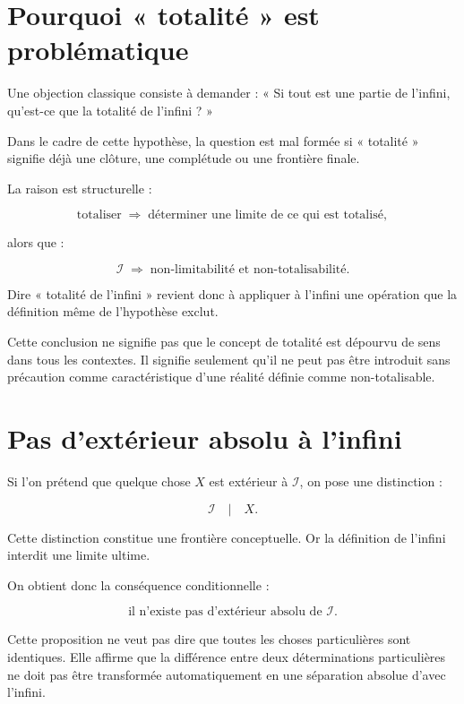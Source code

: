 \documentclass[11pt,a4paper]{article}
\newcommand{\Inf}{\mathcal I}
\begin{document}
\section{Pourquoi « totalité » est problématique}

Une objection classique consiste à demander : « Si tout est une partie de l'infini, qu'est-ce que la totalité de l'infini ? »

Dans le cadre de cette hypothèse, la question est mal formée si « totalité » signifie déjà une clôture, une complétude ou une frontière finale.

La raison est structurelle :

\[
\text{totaliser} \;\Rightarrow\; \text{déterminer une limite de ce qui est totalisé},
\]

alors que :

\[
\Inf \;\Rightarrow\; \text{non-limitabilité et non-totalisabilité}.
\]

Dire « totalité de l'infini » revient donc à appliquer à l'infini une opération que la définition même de l'hypothèse exclut.


Cette conclusion ne signifie pas que le concept de totalité est dépourvu de sens dans tous les contextes. Il signifie seulement qu'il ne peut pas être introduit sans précaution comme caractéristique d'une réalité définie comme non-totalisable.

\section{Pas d'extérieur absolu à l'infini}

Si l'on prétend que quelque chose \(X\) est extérieur à \(\Inf\), on pose une distinction :

\[
\Inf \quad | \quad X.
\]

Cette distinction constitue une frontière conceptuelle. Or la définition de l'infini interdit une limite ultime.

On obtient donc la conséquence conditionnelle :

\[
\boxed{
\text{il n'existe pas d'extérieur absolu de }\Inf.
}
\]

Cette proposition ne veut pas dire que toutes les choses particulières sont identiques. Elle affirme que la différence entre deux déterminations particulières ne doit pas être transformée automatiquement en une séparation absolue d'avec l'infini.
\end{document}
